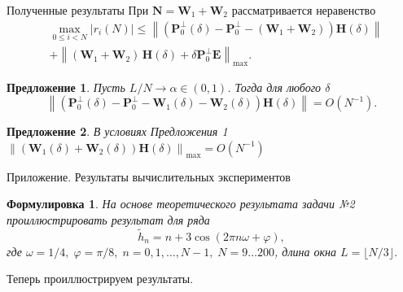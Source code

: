 \documentclass[notheorems, handout]{beamer}
\newtheorem{sentence}{Предложение}
\newtheorem{formulation}{Формулировка}
\newcommand{\norm}[1]{\left\|#1\right\|}
\begin{document}
	\begin{frame}{Полученные результаты}
		При $\mathbf{N}=\mathbf{W}_1 + \mathbf{W}_2$ рассматривается неравенство
		\begin{align*}
			&\max_{0\leqslant i<N} |r_i(N)|\leqslant \norm{(\mathbf{P}_0^\bot(\delta)- \mathbf{P}_0^\bot-(\mathbf{W}_1+\mathbf{W}_2))\mathbf{H}(\delta)}
			\\
			&+\norm{ (\mathbf{W}_1+\mathbf{W}_2)\, \mathbf{H}(\delta) + \delta \mathbf{P}_0^\perp \mathbf{E}}_{\max}.
		\end{align*}
		\begin{sentence}
			Пусть $L/N\rightarrow\alpha\in(0,1)$. Тогда для любого $\delta$
			\begin{equation*}
				\norm{\left(\mathbf{P}_0^\bot(\delta) - \mathbf{P}_0^\bot - \mathbf{W}_1(\delta) - \mathbf{W}_2(\delta)\right)\mathbf{H}(\delta)} = O(N^{-1}).
			\end{equation*}
		\end{sentence}
		\begin{sentence}
			В условиях Предложения 1 $\norm{(\mathbf{W}_1(\delta)+\mathbf{W}_2(\delta))\mathbf{H}(\delta)}_{\max}=O(N^{-1})$
		\end{sentence}
	\end{frame}
	\begin{frame}{Приложение. Результаты вычислительных экспериментов}
		\begin{formulation}
			\textit{На основе теоретического результата задачи №2 проиллюстрировать результат для ряда
				\begin{equation*}
					\widetilde{h}_n = n + 3\cos(2\pi n\omega + \varphi),
				\end{equation*}
				где $\omega = 1/4,\;\varphi = \pi/8,\;n=0,1,\dots,N-1,\;N=9\dots200$, длина окна $L=\lfloor N/3\rfloor$.}
		\end{formulation}
		Теперь проиллюстрируем результаты.
	\end{frame}
\end{document}
